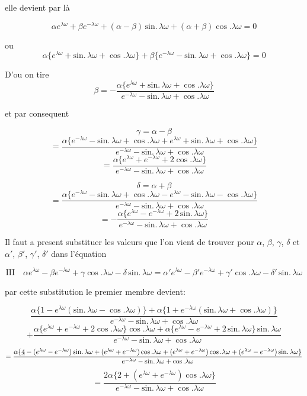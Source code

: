 \documentclass[11pt,a4paper]{article}
\begin{document}
elle devient par là

\[ \alpha e^{\lambda\omega}+\beta e^{-\lambda\omega}+(\alpha-\beta)\,\text{sin.}\,\lambda\omega+(\alpha+\beta)\cos.\lambda\omega=0 \]

ou
\[ \alpha\{e^{\lambda\omega}+\text{sin.}\,\lambda\omega+\cos.\lambda\omega\}+\beta\{e^{-\lambda\omega}-\text{sin.}\,\lambda\omega+\cos.\lambda\omega\}=0 \]

D'ou on tire
\[ \beta=-\frac{\alpha\{e^{\lambda\omega}+\text{sin.}\,\lambda\omega+\cos.\lambda\omega\}}{e^{-\lambda\omega}-\text{sin.}\,\lambda\omega+\cos.\lambda\omega} \]

et par consequent

\[ \gamma=\alpha-\beta \]
\[ =\frac{\alpha\{e^{-\lambda\omega}-\text{sin.}\,\lambda\omega+\cos.\lambda\omega+e^{\lambda\omega}+\text{sin.}\,\lambda\omega+\cos.\lambda\omega\}}{e^{-\lambda\omega}-\text{sin.}\,\lambda\omega+\cos.\lambda\omega} \]
\[ =\frac{\alpha\{e^{\lambda\omega}+e^{-\lambda\omega}+2\cos.\lambda\omega\}}{e^{-\lambda\omega}-\text{sin.}\,\lambda\omega+\cos.\lambda\omega} \]

\[ \delta=\alpha+\beta \]
\[ =\frac{\alpha\{e^{-\lambda\omega}-\text{sin.}\,\lambda\omega+\cos.\lambda\omega-e^{\lambda\omega}-\text{sin.}\,\lambda\omega-\cos.\lambda\omega\}}{e^{-\lambda\omega}-\text{sin.}\,\lambda\omega+\cos.\lambda\omega} \]
\[ =-\frac{\alpha\{e^{\lambda\omega}-e^{-\lambda\omega}+2\,\text{sin.}\,\lambda\omega\}}{e^{-\lambda\omega}-\text{sin.}\,\lambda\omega+\cos.\lambda\omega} \]

Il faut a present substituer les valeurs que l'on vient de trouver pour
$\alpha$, $\beta$, $\gamma$, $\delta$ et $\alpha'$, $\beta'$, $\gamma'$,
$\delta'$ dans l'équation

\[ \text{III}\quad \alpha e^{\lambda\omega}-\beta e^{-\lambda\omega}+\gamma\cos.\lambda\omega-\delta\,\text{sin.}\,\lambda\omega=\alpha' e^{\lambda\omega}-\beta' e^{-\lambda\omega}+\gamma'\cos.\lambda\omega-\delta'\,\text{sin.}\,\lambda\omega \]

par cette substitution le premier membre devient:

\[ \frac{\alpha\{1-e^{\lambda\omega}(\text{sin.}\,\lambda\omega-\cos.\lambda\omega)\}+\alpha\{1+e^{-\lambda\omega}(\text{sin.}\,\lambda\omega+\cos.\lambda\omega)\}}{e^{-\lambda\omega}-\text{sin.}\,\lambda\omega+\cos.\lambda\omega} \]
\[ +\frac{\alpha\{e^{\lambda\omega}+e^{-\lambda\omega}+2\cos.\lambda\omega\}\cos.\lambda\omega+\alpha\{e^{\lambda\omega}-e^{-\lambda\omega}+2\,\text{sin.}\,\lambda\omega\}\,\text{sin.}\,\lambda\omega}{e^{-\lambda\omega}-\text{sin.}\,\lambda\omega+\cos.\lambda\omega} \]
\[ =\frac{\alpha\{\uncertain{4}-(e^{\lambda\omega}-e^{-\lambda\omega})\,\text{sin.}\,\lambda\omega+(e^{\lambda\omega}+e^{-\lambda\omega})\cos.\lambda\omega+(e^{\lambda\omega}+e^{-\lambda\omega})\cos.\lambda\omega+(e^{\lambda\omega}-e^{-\lambda\omega})\,\text{sin.}\,\lambda\omega\}}{e^{-\lambda\omega}-\text{sin.}\,\lambda\omega+\cos.\lambda\omega} \]
\[ =\frac{2\alpha\{2+(e^{\lambda\omega}+e^{-\lambda\omega})\cos.\lambda\omega\}}{e^{-\lambda\omega}-\text{sin.}\,\lambda\omega+\cos.\lambda\omega} \]
\end{document}
